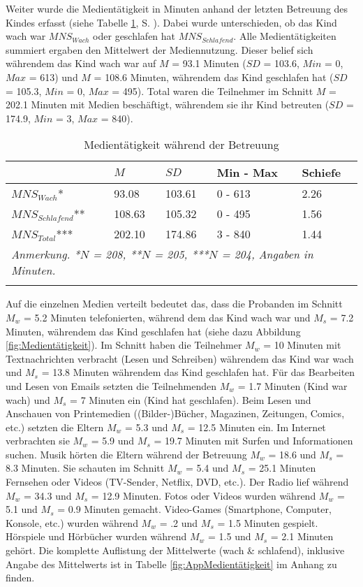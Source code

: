 Weiter wurde die Medientätigkeit in Minuten anhand der letzten Betreuung des Kindes erfasst (siehe Tabelle \ref{table:Medientätigkeit}, S. \pageref{table:Medientätigkeit}). Dabei wurde unterschieden, ob das Kind wach war $MNS_{Wach}$ oder geschlafen hat $MNS_{Schlafend}$. Alle Medientätigkeiten summiert ergaben den Mittelwert der Mediennutzung. Dieser belief sich währendem das Kind wach war auf $M$ = 93.1 Minuten ($SD$ = 103.6, $Min$ = 0, $Max$ = 613) und $M$ = 108.6 Minuten, währendem das Kind geschlafen hat ($SD$ = 105.3, $Min$ = 0, $Max$ = 495). Total waren die Teilnehmer im Schnitt $M$ = 202.1 Minuten mit Medien beschäftigt, währendem sie ihr Kind betreuten ($SD$ = 174.9, $Min$ = 3, $Max$ = 840).

\begin{table}[b]
\begin{tabular}{m{8em} m{4em}  m{4em}  m{5em} m{4em}} 
  \hline
  & $M$ & $SD$ & Min - Max & Schiefe\\
  \hline
  $MNS_{Wach}$* & 93.08 & 103.61 & 0 - 613 & 2.26\\
  $MNS_{Schlafend}$** & 108.63 & 105.32 & 0 - 495 & 1.56\\
  $MNS_{Total}$*** & 202.10 & 174.86 & 3 - 840 & 1.44 \\
  \hline
  \multicolumn{5}{l}{\textit{Anmerkung. *$N$ = 208, **$N$ = 205, ***$N$ = 204, Angaben in Minuten.}}\\
  &&&&\\
\end{tabular}
\caption{Medientätigkeit während der Betreuung}
\label{table:Medientätigkeit}
\end{table}

Auf die einzelnen Medien verteilt bedeutet das, dass die Probanden im Schnitt $M_{w}$ = 5.2 Minuten telefonierten, während dem das Kind wach war und $M_{s}$ = 7.2 Minuten, währendem das Kind geschlafen hat (siehe dazu Abbildung \ref{fig:Medientätigkeit}). Im Schnitt haben die Teilnehmer $M_{w}$ = 10 Minuten mit Textnachrichten verbracht (Lesen und Schreiben) währendem das Kind war wach und $M_{s}$ = 13.8 Minuten währendem das Kind geschlafen hat. Für das Bearbeiten und Lesen von Emails setzten die Teilnehmenden $M_{w}$ = 1.7 Minuten (Kind war wach) und $M_{s}$ = 7 Minuten ein (Kind hat geschlafen). Beim Lesen und Anschauen von Printemedien ((Bilder-)Bücher, Magazinen, Zeitungen, Comics, etc.) setzten die Eltern $M_{w}$ = 5.3 und $M_{s}$ = 12.5 Minuten ein. Im Internet verbrachten sie $M_{w}$ = 5.9 und $M_{s}$ = 19.7 Minuten mit Surfen und Informationen suchen. Musik hörten die Eltern während der Betreuung $M_{w}$ = 18.6 und $M_{s}$ = 8.3 Minuten. Sie schauten im Schnitt $M_{w}$ = 5.4 und $M_{s}$ = 25.1 Minuten Fernsehen oder Videos (TV-Sender, Netflix, DVD, etc.). Der Radio lief während $M_{w}$ = 34.3 und $M_{s}$ = 12.9 Minuten. Fotos oder Videos wurden während $M_{w}$ = 5.1 und $M_{s}$ = 0.9 Minuten gemacht. Video-Games (Smartphone, Computer, Konsole, etc.) wurden während $M_{w}$ = .2 und $M_{s}$ = 1.5 Minuten gespielt. Hörspiele und Hörbücher wurden während $M_{w}$ = 1.5 und $M_{s}$ = 2.1 Minuten gehört. Die komplette Auflistung der Mittelwerte (wach \& schlafend), inklusive Angabe des  Mittelwerts ist in Tabelle \ref{fig:AppMedientätigkeit} im Anhang zu finden.

